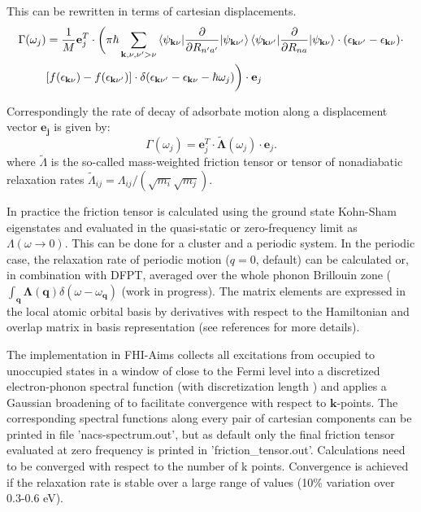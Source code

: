 This can be rewritten in terms of cartesian displacements.
\begin{align}\label{eq-Gamma3}
  \Gamma(\omega_{j}) &= \frac{1}{M} \mathbf{e}^T_{j}\cdot \biggl( \pi\hbar\sum_{\mathbf{k},\nu,\nu'>\nu} \braket{\psi_{\mathbf{k}\nu}|\frac{\partial}{\partial R_{n'a'}}|\psi_{\mathbf{k}\nu'}}\braket{\psi_{\mathbf{k}\nu'}|\frac{\partial}{\partial R_{na}}|\psi_{\mathbf{k}\nu}}\cdot (\epsilon_{\mathbf{k}\nu'}-\epsilon_{\mathbf{k}\nu}) \cdot  \\ \nonumber &    [f(\epsilon_{\mathbf{k}\nu})-f(\epsilon_{\mathbf{k}\nu'})]\cdot\delta(\epsilon_{\mathbf{k}\nu'}-\epsilon_{\mathbf{k}\nu}-\hbar\omega_j) \biggr) \cdot \mathbf{e}_{j}
\end{align}

Correspondingly the rate of decay of adsorbate motion along a displacement vector $\mathbf{e}_{\mathbf{j}}$ is given by:
\begin{equation}
  \Gamma(\omega_{j}) =\mathbf{e}^T_{j}\cdot\tilde{\mathbf{\Lambda}}(\omega_j)\cdot\mathbf{e}_{j}. 
\end{equation}
where $\tilde{\Lambda}$ is the so-called mass-weighted friction tensor or tensor of nonadiabatic relaxation rates $\tilde{\Lambda}_{ij}=\Lambda_{ij}/(\sqrt{m_i}\sqrt{m_j})$. 

In practice the friction tensor is calculated using the ground state Kohn-Sham eigenstates and evaluated in the quasi-static or zero-frequency limit as $\Lambda(\omega\rightarrow0)$. This can be done for a cluster and a periodic system. In the periodic case, the relaxation rate of periodic motion ($q=0$, default) can be calculated or, in combination with DFPT, averaged over the whole phonon Brillouin zone ($\int_{\mathbf{q}} \mathbf{\Lambda}(\mathbf{q})\delta(\omega-\omega_{\mathbf{q}})$ (work in progress). The matrix elements are expressed in the local atomic orbital basis by derivatives with respect to the Hamiltonian and overlap matrix in basis representation (see references for more details).

The implementation in FHI-Aims collects all excitations from occupied to unoccupied states in a window of  close to the Fermi level into a discretized electron-phonon spectral function (with discretization length ) and applies a Gaussian broadening of  to facilitate convergence with respect to $\mathbf{k}$-points. The corresponding spectral functions along every pair of cartesian components can be printed in file 'nacs-spectrum.out', but as default only the final friction tensor evaluated at zero frequency is printed in 'friction\_tensor.out'. Calculations need to be converged with respect to the number of k points. Convergence is achieved if the relaxation rate is stable over a large range of  values (10\% variation over 0.3-0.6 eV).

